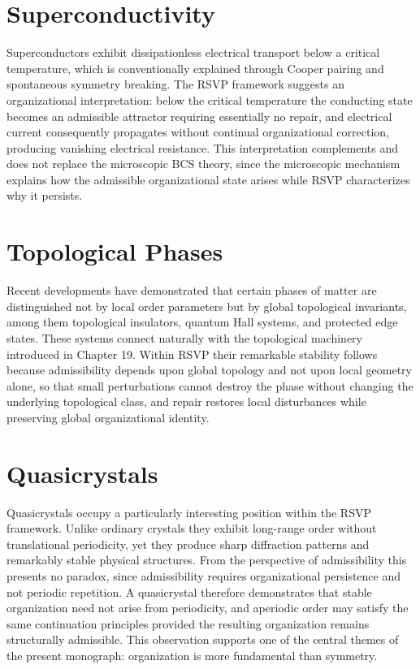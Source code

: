 \documentclass[11pt,oneside]{book}
\numberwithin{equation}{chapter}
\theoremstyle{definition}
\theoremstyle{plain}
\begin{document}
\section{Superconductivity}

Superconductors exhibit dissipationless electrical transport below a critical temperature, which is conventionally explained through Cooper pairing and spontaneous symmetry breaking. The RSVP framework suggests an organizational interpretation: below the critical temperature the conducting state becomes an admissible attractor requiring essentially no repair, and electrical current consequently propagates without continual organizational correction, producing vanishing electrical resistance. This interpretation complements and does not replace the microscopic BCS theory, since the microscopic mechanism explains how the admissible organizational state arises while RSVP characterizes why it persists.

\section{Topological Phases}

Recent developments have demonstrated that certain phases of matter are distinguished not by local order parameters but by global topological invariants, among them topological insulators, quantum Hall systems, and protected edge states. These systems connect naturally with the topological machinery introduced in Chapter 19. Within RSVP their remarkable stability follows because admissibility depends upon global topology and not upon local geometry alone, so that small perturbations cannot destroy the phase without changing the underlying topological class, and repair restores local disturbances while preserving global organizational identity.

\section{Quasicrystals}

Quasicrystals occupy a particularly interesting position within the RSVP framework. Unlike ordinary crystals they exhibit long-range order without translational periodicity, yet they produce sharp diffraction patterns and remarkably stable physical structures. From the perspective of admissibility this presents no paradox, since admissibility requires organizational persistence and not periodic repetition. A quasicrystal therefore demonstrates that stable organization need not arise from periodicity, and aperiodic order may satisfy the same continuation principles provided the resulting organization remains structurally admissible. This observation supports one of the central themes of the present monograph: organization is more fundamental than symmetry.
\end{document}
